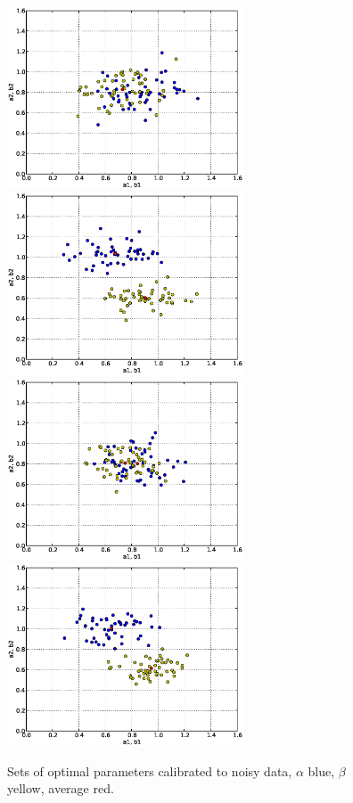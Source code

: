 \begin{figure}
\begin{center}
    \includegraphics[width=7cm]{chapters/schroll/eps/4Dsample3-5.eps}
    \includegraphics[width=7cm]{chapters/schroll/eps/4Dsample3b-5.eps}
    \includegraphics[width=7cm]{chapters/schroll/eps/4Dsample4-5.eps}
    \includegraphics[width=7cm]{chapters/schroll/eps/4Dsample4b-5.eps}
    \end{center}
    \vspace{-0.7cm}
  \caption{Sets of optimal parameters calibrated to noisy data, $\alpha$ blue, $\beta$ yellow, average red. \label{fig7}}
\end{figure}


